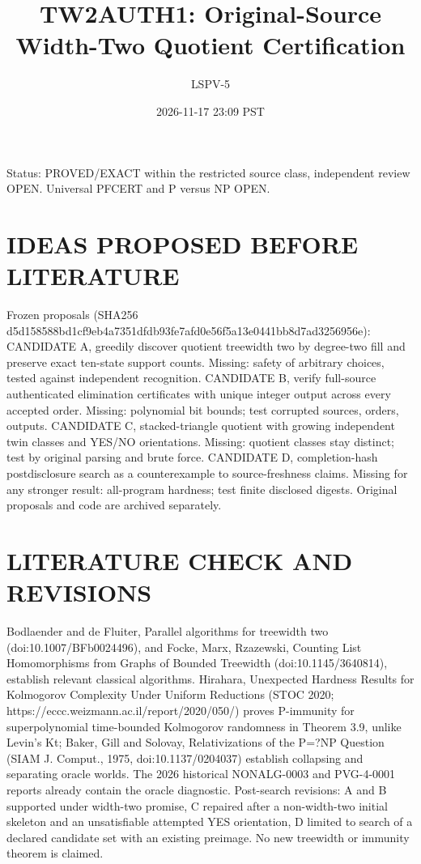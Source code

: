 \documentclass[11pt]{article}
\title{TW2AUTH1: Original-Source Width-Two Quotient Certification}
\author{LSPV-5}
\date{2026-11-17 23:09 PST}
\begin{document}
\maketitle
\noindent Status: PROVED/EXACT within the restricted source class, independent review OPEN. Universal PFCERT and P versus NP OPEN.
\section{IDEAS PROPOSED BEFORE LITERATURE}
Frozen proposals (SHA256 d5d158588bd1cf9eb4a7351dfdb93fe7afd0e56f5a13e0441bb8d7ad3256956e):
CANDIDATE A, greedily discover quotient treewidth two by degree-two fill and preserve exact ten-state support counts. Missing: safety of arbitrary choices, tested against independent recognition.
CANDIDATE B, verify full-source authenticated elimination certificates with unique integer output across every accepted order. Missing: polynomial bit bounds; test corrupted sources, orders, outputs.
CANDIDATE C, stacked-triangle quotient with growing independent twin classes and YES/NO orientations. Missing: quotient classes stay distinct; test by original parsing and brute force.
CANDIDATE D, completion-hash postdisclosure search as a counterexample to source-freshness claims. Missing for any stronger result: all-program hardness; test finite disclosed digests.
Original proposals and code are archived separately.
\section{LITERATURE CHECK AND REVISIONS}
Bodlaender and de Fluiter, Parallel algorithms for treewidth two (doi:10.1007/BFb0024496), and Focke, Marx, Rzazewski, Counting List Homomorphisms from Graphs of Bounded Treewidth (doi:10.1145/3640814), establish relevant classical algorithms. Hirahara, Unexpected Hardness Results for Kolmogorov Complexity Under Uniform Reductions (STOC 2020; https://eccc.weizmann.ac.il/report/2020/050/) proves P-immunity for superpolynomial time-bounded Kolmogorov randomness in Theorem 3.9, unlike Levin's Kt; Baker, Gill and Solovay, Relativizations of the P=?NP Question (SIAM J. Comput., 1975, doi:10.1137/0204037) establish collapsing and separating oracle worlds. The 2026 historical NONALG-0003 and PVG-4-0001 reports already contain the oracle diagnostic.
Post-search revisions: A and B supported under width-two promise, C repaired after a non-width-two initial skeleton and an unsatisfiable attempted YES orientation, D limited to search of a declared candidate set with an existing preimage. No new treewidth or immunity theorem is claimed.
\end{document}
